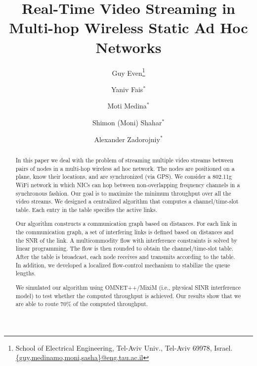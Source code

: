 \documentclass[12pt]{article}
\newenvironment{proof sketch}[1]{\noindent {\emph{Proof sketch of #1:}}}{\hfill \qed}
\begin{document}
\title{Real-Time Video Streaming in Multi-hop Wireless Static Ad Hoc Networks}

\ifnum{}
\author{%
Guy Even\thanks{School of Electrical Engineering,
Tel-Aviv Univ., Tel-Aviv 69978, Israel.
\protect\url{{guy,medinamo,moni,sasha}@eng.tau.ac.il}}
\and
Yaniv Fais$^*$
\and
Moti Medina$^*$
%
\and Shimon (Moni) Shahar$^*$
\and Alexander Zadorojniy$^*$ }
\fi
\date{}

\maketitle



\begin{abstract}
  In this paper we deal with the problem of streaming multiple video
  streams between pairs of nodes in a multi-hop wireless ad hoc
  network.  The nodes are positioned on a plane, know their locations,
  and are synchronized (via GPS). We consider a 802.11g WiFi network
  in which NICs can hop between non-overlapping frequency channels in
  a synchronous fashion. Our goal is to maximize the minimum
  throughput over all the video streams. We designed a centralized
  algorithm that computes a channel/time-slot table.  Each entry in
  the table specifies the active links.

  Our algorithm constructs a communication graph based on distances.
  For each link in the communication graph, a set of interfering links
  is defined based on distances and the SNR of the link.  A
  multicommodity flow with interference constraints is solved by
  linear programming. The flow is then rounded to obtain the
  channel/time-slot table. After the table is broadcast, each node
  receives and transmits according to the table. In addition, we developed a localized
  flow-control mechanism to stabilize the queue lengths.

  We simulated our algorithm using OMNET++/MixiM (i.e., physical SINR
  interference model) to test whether the computed throughput is
  achieved. Our results show that we are able to route 70\% of the
  computed throughput.
\end{abstract}

\end{document}
